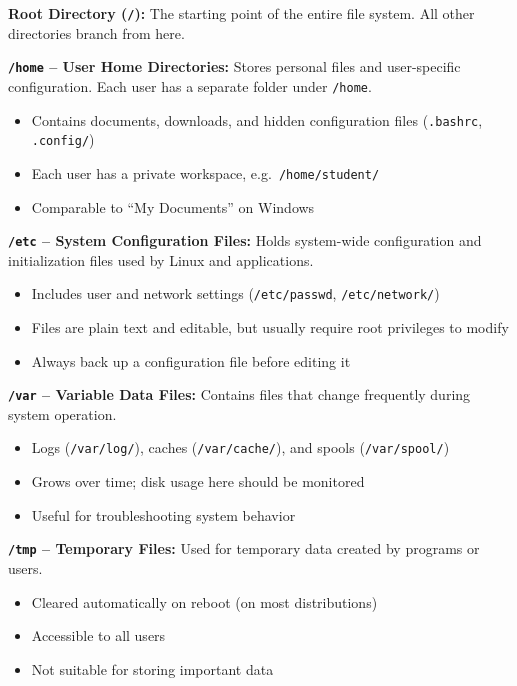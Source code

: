 \textbf{Root Directory (\texttt{/}):} The starting point of the entire file system. All other directories branch from here.

\textbf{\texttt{/home} -- User Home Directories:}
Stores personal files and user-specific configuration. Each user has a separate folder under \texttt{/home}.
\begin{itemize}
    \item Contains documents, downloads, and hidden configuration files (\texttt{.bashrc}, \texttt{.config/})
    \item Each user has a private workspace, e.g.\ \texttt{/home/student/}
    \item Comparable to ``My Documents'' on Windows
\end{itemize}

\textbf{\texttt{/etc} -- System Configuration Files:}
Holds system-wide configuration and initialization files used by Linux and applications.
\begin{itemize}
    \item Includes user and network settings (\texttt{/etc/passwd}, \texttt{/etc/network/})
    \item Files are plain text and editable, but usually require root privileges to modify
    \item Always back up a configuration file before editing it
\end{itemize}

\textbf{\texttt{/var} -- Variable Data Files:}
Contains files that change frequently during system operation.
\begin{itemize}
    \item Logs (\texttt{/var/log/}), caches (\texttt{/var/cache/}), and spools (\texttt{/var/spool/})
    \item Grows over time; disk usage here should be monitored
    \item Useful for troubleshooting system behavior
\end{itemize}

\textbf{\texttt{/tmp} -- Temporary Files:}
Used for temporary data created by programs or users.
\begin{itemize}
    \item Cleared automatically on reboot (on most distributions)
    \item Accessible to all users
    \item Not suitable for storing important data
\end{itemize}

